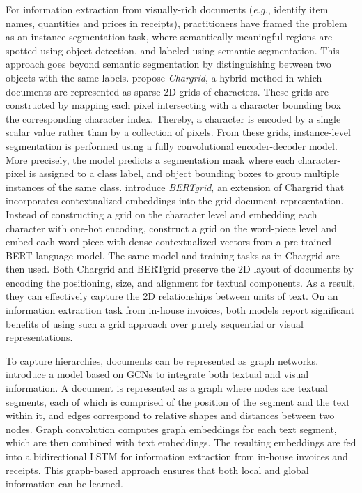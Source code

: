 For information extraction from visually-rich documents (\textit{e.g.}, identify item names, quantities and prices in receipts), practitioners have framed the problem as an instance segmentation task, where semantically meaningful regions are spotted using object detection, and labeled using semantic segmentation. This approach goes beyond semantic segmentation by distinguishing between two objects with the same labels. \citet{katti2018chargrid} propose \textit{Chargrid}, a hybrid method in which documents are represented as sparse 2D grids of characters. These grids are constructed by mapping each pixel intersecting with a character bounding box the corresponding character index. Thereby, a character is encoded by a single scalar value rather than by a collection of pixels. From these grids, instance-level segmentation is performed using a fully convolutional encoder-decoder model. More precisely, the model predicts a segmentation mask where each character-pixel is assigned to a class label, and object bounding boxes to group multiple instances of the same class. \citet{denk2019bertgrid} introduce \textit{BERTgrid}, an extension of Chargrid that incorporates contextualized embeddings into the grid document representation. Instead of constructing a grid on the character level and embedding each character with one-hot encoding, \citet{denk2019bertgrid} construct a grid on the word-piece level and embed each word piece with dense contextualized vectors from a pre-trained \ac{BERT} language model. The same model and training tasks as in Chargrid are then used. Both Chargrid and BERTgrid preserve the 2D layout of documents by encoding the positioning, size, and alignment for textual components. As a result, they can effectively capture the 2D relationships between units of text. On an information extraction task from in-house invoices, both models report significant benefits of using such a grid approach over purely sequential or visual representations.


To capture hierarchies, documents can be represented as graph networks. \citet{liu2019graph} introduce a model based on \acp{GCN} to integrate both textual and visual information. A document is represented as a graph where nodes are textual segments, each of which is comprised of the position of the segment and the text within it, and edges correspond to relative shapes and distances between two nodes. Graph convolution computes graph embeddings for each text segment, which are then combined with text embeddings. The resulting embeddings are fed into a bidirectional \ac{LSTM} for information extraction from in-house invoices and receipts. This graph-based approach ensures that both local and global information can be learned. \\

